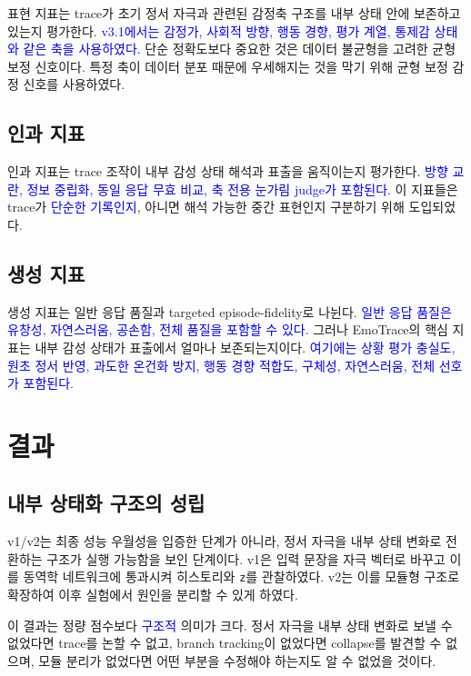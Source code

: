 ﻿\documentclass[11pt,a4paper]{article}
\newcommand{\eng}[1]{\texttt{#1}}
\begin{document}
표현 지표는 trace가 초기 정서 자극과 관련된 감정축 구조를 내부 상태 안에 보존하고 있는지 평가한다. \textcolor{blue}{v3.1에서는 감정가, 사회적 방향, 행동 경향, 평가 계열, 통제감 상태와 같은 축을 사용하였다.} 단순 정확도보다 중요한 것은 데이터 불균형을 고려한 균형 보정 신호이다. 특정 축이 데이터 분포 때문에 우세해지는 것을 막기 위해 균형 보정 감정 신호를 사용하였다.

\subsection{인과 지표}

인과 지표는 trace 조작이 내부 감성 상태 해석과 표출을 움직이는지 평가한다. \textcolor{blue}{방향 교란, 정보 중립화, 동일 응답 무효 비교, 축 전용 눈가림 judge가 포함된다.} 이 지표들은 trace가 \textcolor{blue}{단순한 기록인지}, 아니면 해석 가능한 중간 표현인지 구분하기 위해 도입되었다.

\subsection{생성 지표}

생성 지표는 일반 응답 품질과 targeted episode-fidelity로 나뉜다. \textcolor{blue}{일반 응답 품질은 유창성, 자연스러움, 공손함, 전체 품질을 포함할 수 있다.} 그러나 EmoTrace의 핵심 지표는 내부 감성 상태가 표출에서 얼마나 보존되는지이다. \textcolor{blue}{여기에는 상황 평가 충실도, 원초 정서 반영, 과도한 온건화 방지, 행동 경향 적합도, 구체성, 자연스러움, 전체 선호가 포함된다.}

\section{결과}

\subsection{내부 상태화 구조의 성립}

v1/v2는 최종 성능 우월성을 입증한 단계가 아니라, 정서 자극을 내부 상태 변화로 전환하는 구조가 실행 가능함을 보인 단계이다. v1은 입력 문장을 자극 벡터로 바꾸고 이를 동역학 네트워크에 통과시켜 히스토리와 \eng{z}를 관찰하였다. v2는 이를 모듈형 구조로 확장하여 이후 실험에서 원인을 분리할 수 있게 하였다.

이 결과는 정량 점수보다 \textcolor{blue}{구조적} 의미가 크다. 정서 자극을 내부 상태 변화로 보낼 수 없었다면 trace를 논할 수 없고, branch tracking이 없었다면 collapse를 발견할 수 없으며, 모듈 분리가 없었다면 어떤 부분을 수정해야 하는지도 알 수 없었을 것이다.
\end{document}
